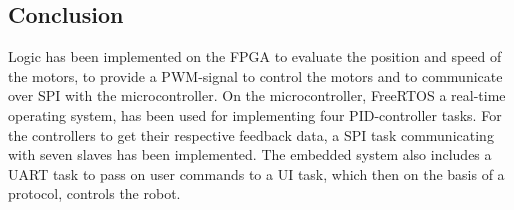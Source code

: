 \documentclass[../../main.tex]{subfiles}
\begin{document}
    





\subsection{Conclusion}

Logic has been implemented on the FPGA to evaluate the position and speed of the motors, to provide a PWM-signal to control the motors and to communicate over SPI with the microcontroller. On the microcontroller, FreeRTOS a real-time operating system, has been used for implementing four PID-controller tasks. For the controllers to get their respective feedback data, a SPI task communicating with seven slaves has been implemented.
The embedded system also includes a UART task to pass on user commands to
a UI task, which then on the basis of a protocol, controls the robot.
\end{document}
